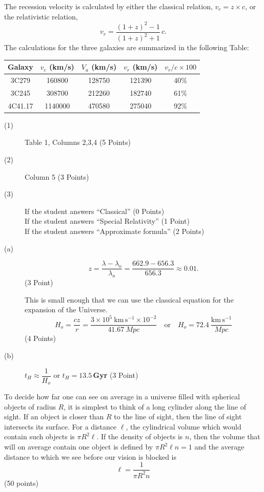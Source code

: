 The recession velocity is calculated by either the classical relation,
$v_c = z\times c$, or the relativistic relation,
\[
v_r = \frac{(1+z)^2 - 1}{(1+z)^2 + 1}\,c.
\]
The calculations for the three galaxies are summarized in the following
Table:

\begin{center}
\begin{tabular}{|c|c|c|c|c|}
\hline
Galaxy & $v_c$ (km/s) & $V_a$ (km/s) & $v_r$ (km/s) & $v_r/c \times 100$\\
\hline
3C279 & 160800 & 128750 & 121390 & 40\%\\
\hline
3C245 & 308700 & 212260 & 182740 & 61\%\\
\hline
4C41.17 & 1140000 & 470580 & 275040 & 92\%\\
\hline
\end{tabular}
\end{center}

\begin{description}
\item[(1)] Table 1, Columns 2,3,4 \hfill(5 Points)
\item[(2)] Column 5 \hfill(3 Points)
\item[(3)] If the student answers ``Classical'' \hfill(0 Points)\\
  If the student answers ``Special Relativity'' \hfill(1 Point)\\
  If the student answers ``Approximate formula'' \hfill(2 Points)
\end{description}

\begin{description}
\item[(a)]
\[
z = \frac{\lambda - \lambda_o}{\lambda_o}
= \frac{662.9 - 656.3}{656.3} \approx 0.01.
\]
\hfill(3 Point)

This is small enough that we can use the classical equation for the expansion
of the Universe.
\[
H_o = \frac{cz}{r}
= \frac{3\times10^{5}\ \mathrm{km\,s^{-1}} \times 10^{-2}}{41.67\ Mpc}
\quad\text{or}\quad
H_o = 72.4\ \frac{\mathrm{km\,s^{-1}}}{Mpc}
\]
\hfill(4 Points)

\item[(b)] $t_H \approx \dfrac{1}{H_o}$ or $t_H = 13.5$\,\textbf{Gyr}
\hfill(3 Point)
\end{description}

To decide how far one can see on average in a universe filled with spherical
objects of radius $R$, it is simplest to think of a long cylinder along the
line of sight. If an object is closer than $R$ to the line of sight, then the
line of sight intersects its surface. For a distance $\ell$, the cylindrical
volume which would contain such objects is $\pi R^2\ell$. If the density of
objects is $n$, then the volume that will on average contain one object is
defined by $\pi R^2\ell n = 1$ and the average distance to which we see
before our vision is blocked is
\[
\ell = \frac{1}{\pi R^2 n}
\]
\hfill(50 points)

